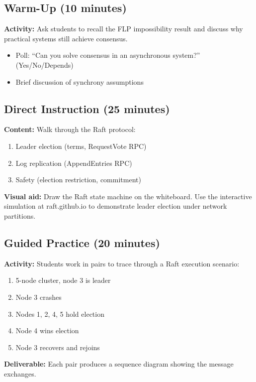 \documentclass[
    language=english,
    doctype=lesson-plan,
    institution=none,
]{../../omnilatex}
\begin{document}
\subsection{Warm-Up (10 minutes)}
\textbf{Activity:} Ask students to recall the FLP impossibility result
and discuss why practical systems still achieve consensus.

\begin{itemize}
    \item Poll: ``Can you solve consensus in an asynchronous system?'' (Yes/No/Depends)
    \item Brief discussion of synchrony assumptions
\end{itemize}

\subsection{Direct Instruction (25 minutes)}
\textbf{Content:} Walk through the Raft protocol:

\begin{enumerate}
    \item Leader election (terms, RequestVote RPC)
    \item Log replication (AppendEntries RPC)
    \item Safety (election restriction, commitment)
\end{enumerate}

\textbf{Visual aid:} Draw the Raft state machine on the whiteboard.
Use the interactive simulation at raft.github.io to demonstrate
leader election under network partitions.

\subsection{Guided Practice (20 minutes)}
\textbf{Activity:} Students work in pairs to trace through a Raft
execution scenario:

\begin{enumerate}
    \item 5-node cluster, node 3 is leader
    \item Node 3 crashes
    \item Nodes 1, 2, 4, 5 hold election
    \item Node 4 wins election
    \item Node 3 recovers and rejoins
\end{enumerate}

\textbf{Deliverable:} Each pair produces a sequence diagram showing
the message exchanges.
\end{document}
